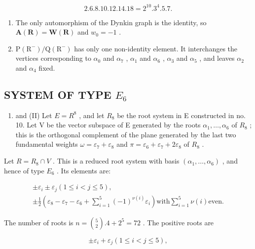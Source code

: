 \[
2. 6. 8. 10. 12. 14. 18 = 2 ^ {10}. 3 ^ {4}. 5. 7.
\]

\begin{enumerate}
\def\labelenumi{(\Roman{enumi})}
\setcounter{enumi}{10}
\item
  The only automorphism of the Dynkin graph is the identity, so \(\mathbf{A}(\mathbf{R}) = \mathbf{W}(\mathbf{R})\) and \(w_0 = -1\) .
\item
  \(\mathrm{P}(\mathrm{R}^{-})/\mathrm{Q}(\mathrm{R}^{-})\) has only one non-identity element. It interchanges the vertices corresponding to \(\alpha_{0}\) and \(\alpha_{7}\) , \(\alpha_{1}\) and \(\alpha_{6}\) , \(\alpha_{3}\) and \(\alpha_{5}\) , and leaves \(\alpha_{2}\) and \(\alpha_{4}\) fixed.
\end{enumerate}

\subsection{\texorpdfstring{SYSTEM OF TYPE \(E_{6}\)}{SYSTEM OF TYPE E\_6}}

\begin{enumerate}
\def\labelenumi{(\Roman{enumi})}
\tightlist
\item
  and (II) Let \(E = R^{8}\) , and let \(R_{8}\) be the root system in E constructed in no. 10. Let V be the vector subspace of E generated by the roots \(\alpha_{1}, \ldots, \alpha_{6}\) of \(R_{8}\) ; this is the orthogonal complement of the plane generated by the last two fundamental weights \(\omega = \varepsilon_{7} + \varepsilon_{8}\) and \(\pi = \varepsilon_{6} + \varepsilon_{7} + 2\varepsilon_{8}\) of \(R_{8}\) .
\end{enumerate}

Let \(R = R_{8} \cap V\) . This is a reduced root system with basis \((\alpha_{1}, \ldots, \alpha_{6})\) , and hence of type \(E_{6}\) . Its elements are:

\[
\begin{array}{c} \pm \varepsilon_ {i} \pm \varepsilon_ {j} (1 \leqslant i <   j \leqslant 5), \\ \pm \frac {1}{2} (\varepsilon_ {8} - \varepsilon_ {7} - \varepsilon_ {6} + \sum_ {i = 1} ^ {5} (- 1) ^ {\nu (i)} \varepsilon_ {i}) \text {with} \sum_ {i = 1} ^ {5} \nu (i) \text {even.} \end{array}
\]

The number of roots is \(n = \binom{5}{2}.4 + 2^5 = 72\) . The positive roots are

\[
\pm \varepsilon_ {i} + \varepsilon_ {j} (1 \leqslant i <   j \leqslant 5),
\]

